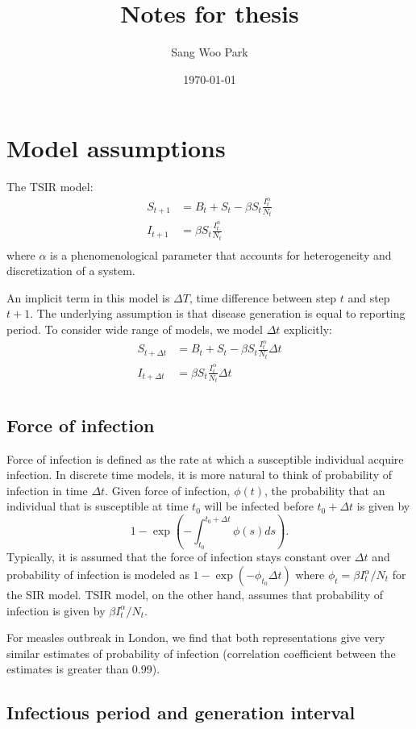 \documentclass{article}
\title{Notes for thesis}
\date{\today}
\author{Sang Woo Park}
\begin{document}
\maketitle

\section{Model assumptions}

The TSIR model:
\begin{equation}
\begin{aligned}
S_{t+1} &= B_t + S_t - \beta S_t \frac{I_t^\alpha}{N_t}\\
I_{t+1} &= \beta S_t \frac{I_t^\alpha}{N_t}\\
\end{aligned}
\end{equation}
where $\alpha$ is a phenomenological parameter that accounts for heterogeneity and discretization of a system.

An implicit term in this model is $\Delta T$, time difference between step $t$ and step $t+1$. The underlying assumption is that disease generation is equal to reporting period. To consider wide range of models, we model $\Delta t$ explicitly:
\begin{equation}
\begin{aligned}
S_{t+\Delta t} &= B_t + S_t - \beta S_t \frac{I_t^\alpha}{N_t} \Delta t\\
I_{t+\Delta t} &= \beta S_t \frac{I_t^\alpha}{N_t} \Delta t\\
\end{aligned}
\end{equation}

\subsection{Force of infection}

Force of infection is defined as the rate at which a susceptible individual acquire infection.
In discrete time models, it is more natural to think of probability of infection in time $\Delta t$.
Given force of infection, $\phi(t)$, the probability that an individual that is susceptible at time $t_0$ will be infected before $t_0 + \Delta t$ is given by
\begin{equation}
1 - \exp\left(-\int_{t_0}^{t_0 + \Delta t} \phi(s) ds\right).
\end{equation}
Typically, it is assumed that the force of infection stays constant over $\Delta t$ and probability of infection is modeled as $1 - \exp(- \phi_{t_0} \Delta t)$ where $\phi_t = \beta I_t^\alpha/N_t$ for the SIR model.
TSIR model, on the other hand, assumes that probability of infection is given by $\beta I_t^\alpha/N_t$.

For measles outbreak in London, we find that both representations give very similar estimates of probability of infection (correlation coefficient between the estimates is greater than 0.99).

\subsection{Infectious period and generation interval}
\end{document}
